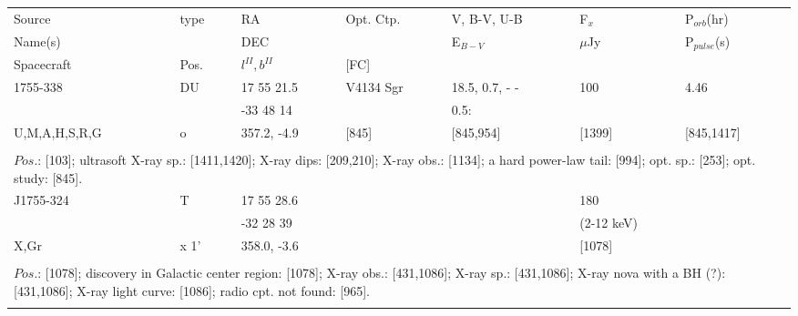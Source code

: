 \documentclass{aa}
\begin{document}
\begin{tabular}{p{2.5cm}p{1cm}p{1.8cm}p{2.3cm}p{3.3cm}p{2.0cm}p{2.2cm}}
\noalign{\smallskip}
\multicolumn{7}{p{17.5cm}}{Table 1.  (continued) }\\        
\hline
\noalign{\smallskip}
Source         & type  & RA                       &  Opt. Ctp. & V, B-V, U-B  & F$_{x}$          & P$_{orb}$(hr)    \\
Name(s)       &            & DEC                    &                     & E$_{B-V}$   & $\mu$Jy        & P$_{pulse}$(s) \\
Spacecraft & Pos.  & $l^{II}, b^{II}$      &  [FC]           &                        &                         &                             \\
\noalign{\smallskip} 
\hline

\noalign{\smallskip}
1755-338              & DU          & 17 55 21.5             & V4134 Sgr        & 18.5, 0.7, - -       & 100               & 4.46              \\
                               &                 & -33 48 14               &                             & 0.5:                     &                       &                       \\
U,M,A,H,S,R,G    & o             & 357.2, -4.9             & [845]                   & [845,954]           & [1399]          & [845,1417]    \\
\\
\multicolumn{7}{p{17.5cm}}{
$Pos$.: [103]; ultrasoft X-ray sp.: [1411,1420]; X-ray dips: [209,210]; X-ray obs.: [1134]; a hard power-law tail: [994]; 
opt. sp.: [253]; opt. study: [845].}\\
\noalign{\smallskip}
\hline


\noalign{\smallskip}
J1755-324     & T     & 17 55 28.6   &                  &                        & 180                  &          \\
                        &         & -32 28 39     &                  &                        & (2-12 keV)      &          \\
X,Gr               & x 1'   & 358.0, -3.6   &                  &                        & [1078]             &          \\
\\
\multicolumn{7}{p{17.5cm}}{
$Pos$.: [1078]; discovery in Galactic center region: [1078]; X-ray obs.: [431,1086]; X-ray sp.: [431,1086]; X-ray nova 
with a BH (?): [431,1086]; X-ray light curve: [1086]; radio cpt. not found: [965].}\\
\noalign{\smallskip}
\hline


\end{tabular}
\end{document}
